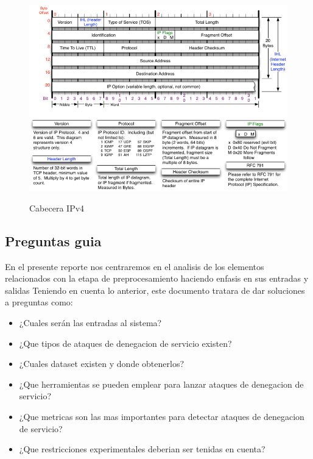 \documentclass[12pt]{article}
\begin{document}
\begin{figure}[htbp]
\begin{center}
\includegraphics[scale=0.3]{IPv4_header.png}\\[1cm] %
\caption{Cabecera IPv4}
\end{center}
\end{figure}

\subsection{Preguntas guia}

En el presente reporte nos centraremos en el analisis de los elementos relacionados con la etapa de preprocesamiento haciendo enfasis en sus entradas y salidas Teniendo en cuenta lo anterior, este documento tratara de dar soluciones a preguntas como:
\begin{itemize}
\item ¿Cuales serán las entradas al sistema?
\item ¿Que tipos de ataques de denegacion de servicio existen?
\item ¿Cuales dataset existen y donde obtenerlos?
\item ¿Que herramientas se pueden emplear para lanzar ataques de denegacion de servicio?
\item ¿Que metricas son las mas importantes para detectar ataques de denegacion de servicio?
\item ¿Que restricciones experimentales deberian ser tenidas en cuenta?
\end{itemize}
\end{document}
